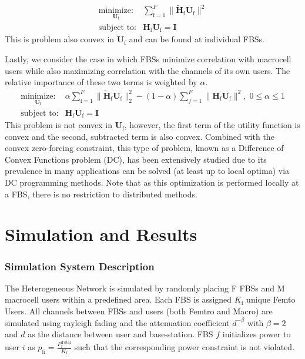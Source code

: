 \documentclass[12pt,a4paper]{report}
\begin{document}
    \begin{equation}
    \begin{array}{ll}
    \underset{\mathbf{U}_{\mathrm{f}} }{\text{minimize:}}   & \sum^F_{\text{f}=1} \|\mathbf{\tilde{H}}_{\mathrm{f}}  \mathbf{U_{\mathrm{f}}}\|^2
    \\
    \mbox{subject to:} & \mathbf{H}_{\mathrm{f}} \mathbf{U_{\mathrm{f}}} = \mathbf{I}
    \end{array}
    \label{e-opt-prob}
    \end{equation}
This is problem also convex in $\mathbf{U}_{\mathrm{f}}$ and can be found at individual FBSs.

\par
Lastly, we consider the case in which FBSs minimize correlation with macrocell users while also maximizing correlation with the channels of its own users. The relative importance of these two terms is weighted by $\alpha.$
    \begin{equation}
    \begin{array}{ll}
    \underset{\mathbf{U}_{\mathrm{f}} }{\text{minimize:}}   & \alpha\sum^F_{\text{f}=1} \|\mathbf{\tilde{H}}_{\mathrm{f}}  \mathbf{U_{\mathrm{f}}}\|^2_2
    -
    (1-\alpha)\sum^F_{f=1} \|\mathbf{H}_{\mathrm{f}}  \mathbf{U_{\mathrm{f}}}\|^2, \; 0\leq \alpha \leq 1
    \\
    \mbox{subject to:} & \mathbf{H}_{\mathrm{f}}  \mathbf{U_{\mathrm{f}}} = \mathbf{I}
    \end{array}
    \label{e-opt-prob}
    \end{equation}
    This problem is not convex in $\mathbf{U}_{\mathrm{f}}$, however, the first term of the utility function is convex and the second, subtracted term is also convex. Combined with the convex zero-forcing constraint, this type of problem, known as a Difference of Convex Functions problem (DC), has been extensively studied due to its prevalence in many applications can be solved (at least up to local optima) via DC programming methods. Note that as this optimization is performed locally at a FBS, there is no restriction to distributed methods.
     


\chapter{Simulation and Results}\label{numerical}
\subsection{Simulation System Description}
The Heterogeneous Network is simulated by randomly placing F FBSs and M macrocell users within a predefined area. Each FBS is assigned $K_{\mathrm{f}}$ unique Femto Users. All channels between FBSs and users (both Femtro and Macro) are simulated using rayleigh fading and the attenuation coefficient $d^{- \beta}$ with $\beta =2$ and $d$ as the distance between user and base-station.
FBS $f$ initializes power to user $i$ as $p_{\mathrm{fi}} = \frac{{P_{\mathrm{f}}^{\text{Total}}}}{K_{\mathrm{f}}} $ such that the corresponding power constraint is not violated. 
\end{document}
